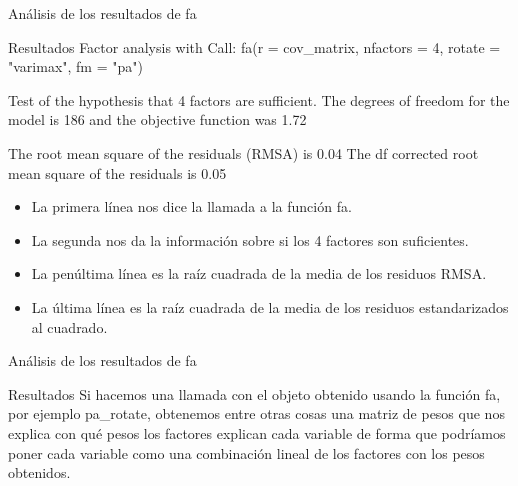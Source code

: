 \documentclass[10pt]{beamer}
\begin{document}
\begin{frame}[fragile]{Análisis de los resultados de fa}
	\begin{alertblock}{Resultados}
		Factor analysis with Call: fa(r = cov\_matrix, nfactors = 4, rotate = "varimax", fm = "pa")
		
		Test of the hypothesis that 4 factors are sufficient.
		The degrees of freedom for the model is 186  and the objective function was  1.72 
		
		The root mean square of the residuals (RMSA) is  0.04 
		The df corrected root mean square of the residuals is  0.05 
		
		\begin{itemize}
			\item La primera línea nos dice la llamada a la función fa.
			\item La segunda nos da la información sobre si los 4 factores son suficientes.
			\item La penúltima línea es la raíz cuadrada de la media de los residuos RMSA.
			\item La última línea es la raíz cuadrada de la media de los residuos estandarizados al cuadrado.
		\end{itemize}
	\end{alertblock}
\end{frame}

\begin{frame}[fragile]{Análisis de los resultados de fa}
\begin{alertblock}{Resultados}
	Si hacemos una llamada con el objeto obtenido usando la función fa, por ejemplo pa\_rotate, obtenemos entre otras cosas una matriz de pesos que nos explica con qué pesos los factores explican cada variable de forma que podríamos poner cada variable como una combinación lineal de los factores con los pesos obtenidos.
\end{alertblock}
\end{frame}
\end{document}
